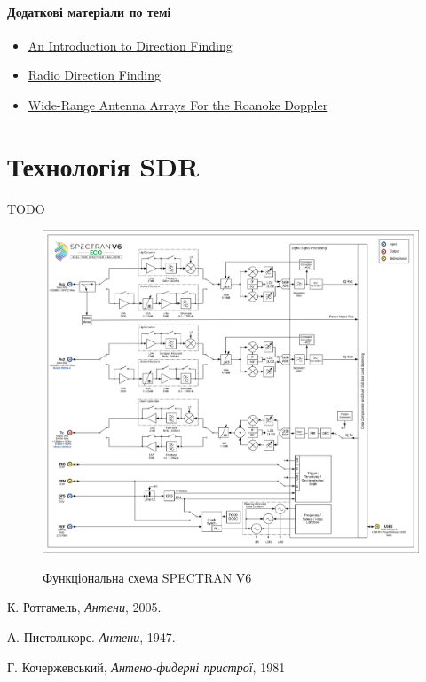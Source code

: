 \documentclass{article}
\begin{document}

\subsection{Додаткові матеріали по темі}
\begin{itemize}[noitemsep, topsep=8pt]
\item \href{https://www.youtube.com/watch?v=N8rZIAHxAH4}{An Introduction to Direction Finding}
\item \href{https://www.cryptomuseum.com/df/df.htm}{Radio Direction Finding}	
\item \href{http://www.homingin.com/newdopant.html}{Wide-Range Antenna Arrays For the Roanoke Doppler}
\end{itemize}


\newpage
\part{Технологія SDR}
TODO

\begin{figure}[H]
\centering
{\includegraphics[width=0.8\linewidth]{images/spectran-functional-diagram.png}}
\caption{Функціональна схема SPECTRAN V6}
\end{figure}



\begin{thebibliography}{99}

К. Ротгамель, \textit{Антени}, 2005.

А. Пистолькорс. \textit{Антени}, 1947.

Г. Кочержевський, \textit{Антено-фидерні пристрої}, 1981

\end{thebibliography}
\end{document}
